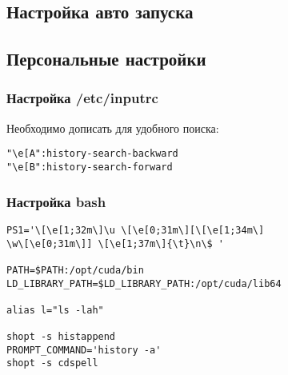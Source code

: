 \documentclass[12pt, a4paper]{article}
\begin{document}
\subsection{Настройка авто запуска}


\subsection{Персональные настройки}

\subsubsection{Настройка /etc/inputrc}

Необходимо дописать для удобного поиска:

\begin{verbatim}
"\e[A":history-search-backward
"\e[B":history-search-forward
\end{verbatim}


\subsubsection{Настройка bash}
\begin{verbatim}
PS1='\[\e[1;32m\]\u \[\e[0;31m\][\[\e[1;34m\]
\w\[\e[0;31m\]] \[\e[1;37m\]{\t}\n\$ '

PATH=$PATH:/opt/cuda/bin
LD_LIBRARY_PATH=$LD_LIBRARY_PATH:/opt/cuda/lib64

alias l="ls -lah"

shopt -s histappend
PROMPT_COMMAND='history -a'
shopt -s cdspell
\end{verbatim}
\end{document}
